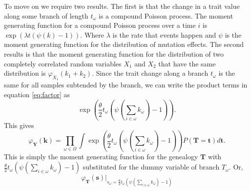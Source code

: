 To move on we require two results. The first is that the change in a
trait value along some branch of length $t_\omega$ is a compound
Poisson process. The moment generating function for a compound Poisson
process over a time $i$ is $\exp\left(\lambda t (\psi(k)-1)\right)$.
Where $\lambda$ is the rate that events happen and $\psi$ is the
moment generating function for the distribution of mutation effects.
The second results is that the moment generating function for the
distribution of two completely correlated random variables $X_1$ and
$X_2$ that have the same distribution is $\varphi_{X_1}(k_1+k_2)$. Since
the trait change along a branch $t_{\omega}$ is the same for all
samples subtended by the branch, we can write the product terms in
equation \ref{eq:factor} as
\begin{equation}
  \exp\left( \frac{\theta}{2} t_{\omega} \left( \psi\left(\sum_{i \in \omega}k_{\omega}\right) -1 \right)\right).
\end{equation}
This gives
\begin{equation}
  \varphi_{\mathbf{Y}}(\mathbf{k}) = \prod_{\omega \in \Omega}
  \int \exp\left( \frac{\theta}{2} t_{\omega} \left( \psi\left(\sum_{i \in \omega}k_{\omega}\right) -1 \right)\right)
  P(\mathbf{T}=\mathbf{t})d\mathbf{t}.
\end{equation}
This is simply the moment generating function for the genealogy
$\mathbf{T}$ with $\frac{\theta}{2} t_{\omega} \left( \psi(\sum_{i \in
  \omega}k_{\omega}) -1 \right)$ substituted for the dummy variable of
branch $T_{\omega}$. Or,
\begin{equation}
  \varphi_{\mathbf{T}}(\mathbf{s})\Bigr|_{s_{\omega}=\frac{\theta}{2} t_{\omega} \left( \psi\left(\sum_{i \in \omega}k_{\omega}\right) -1 \right)}
\end{equation}

